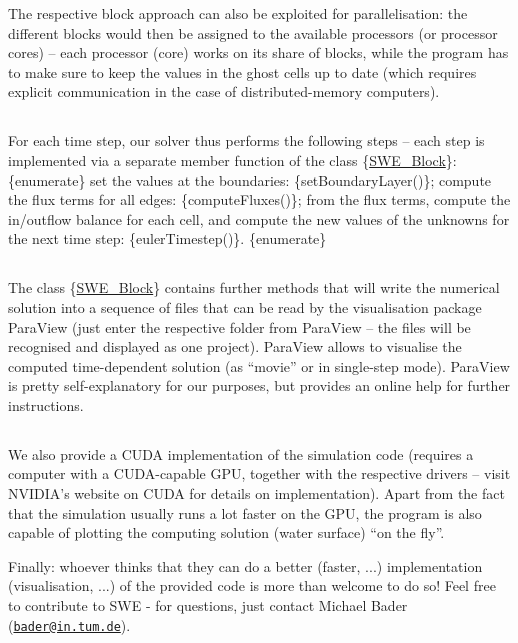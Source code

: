 The respective block approach can also be exploited for parallelisation\-: the different blocks would then be assigned to the available processors (or processor cores) -- each processor (core) works on its share of blocks, while the program has to make sure to keep the values in the ghost cells up to date (which requires explicit communication in the case of distributed-\/memory computers).\hypertarget{_}{}\subsection{}\label{_}
For each time step, our solver thus performs the following steps -- each step is implemented via a separate member function of the class \{\hyperlink{classSWE__Block}{S\-W\-E\-\_\-\-Block}\}\-: \{enumerate\}  set the values at the boundaries\-: \{set\-Boundary\-Layer()\};  compute the flux terms for all edges\-: \{compute\-Fluxes()\};  from the flux terms, compute the in/outflow balance for each cell, and compute the new values of the unknowns for the next time step\-: \{euler\-Timestep()\}. \{enumerate\}\hypertarget{_}{}\subsection{}\label{_}
The class \{\hyperlink{classSWE__Block}{S\-W\-E\-\_\-\-Block}\} contains further methods that will write the numerical solution into a sequence of files that can be read by the visualisation package Para\-View (just enter the respective folder from Para\-View -- the files will be recognised and displayed as one project). Para\-View allows to visualise the computed time-\/dependent solution (as ``movie'' or in single-\/step mode). Para\-View is pretty self-\/explanatory for our purposes, but provides an online help for further instructions.\hypertarget{_}{}\subsection{}\label{_}
We also provide a C\-U\-D\-A implementation of the simulation code (requires a computer with a C\-U\-D\-A-\/capable G\-P\-U, together with the respective drivers -- visit N\-V\-I\-D\-I\-A's website on C\-U\-D\-A for details on implementation). Apart from the fact that the simulation usually runs a lot faster on the G\-P\-U, the program is also capable of plotting the computing solution (water surface) ``on the fly''.

Finally\-: whoever thinks that they can do a better (faster, ...) implementation (visualisation, ...) of the provided code is more than welcome to do so! Feel free to contribute to S\-W\-E -\/ for questions, just contact Michael Bader (\href{mailto:bader@in.tum.de}{\tt bader@in.\-tum.\-de}). 